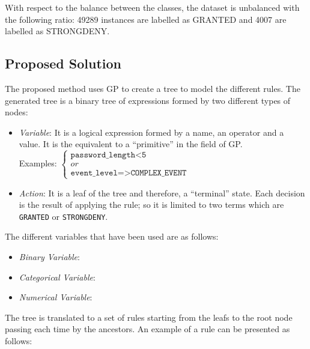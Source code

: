 \documentclass[a4paper,10pt,twocolumn,preprint,3p]{elsarticle}
\begin{document}
With respect to the balance between the classes, the dataset is unbalanced with the following ratio: 49289 instances are labelled as GRANTED and 4007 are labelled as STRONGDENY.

\subsection{Proposed Solution}
\label{subsec:solution}
The proposed method uses GP to create a tree to model the different rules. The generated tree
is a binary tree of expressions formed by two different types of nodes:

\begin{itemize}
\item {\em Variable}: It is a logical expression formed by a name, an operator and a value. It is the equivalent to a ``primitive'' in the field of GP. \\
    Examples:
   \begin{math}
     \left \{
   \begin{array}{l}
     \texttt{password\_length<5} \\
     or \\
      \texttt{event\_level=>COMPLEX\_EVENT}
   \end{array}
   \right .
   \end{math}
\item {\em Action}: It is a leaf of the   tree and therefore, a ``terminal'' state. Each decision is the result of applying the rule; so it is limited to two terms which are \texttt{GRANTED} or \texttt{STRONGDENY}.
\end{itemize}

The different variables that have been used are as follows:

\begin{itemize}
\item {\em Binary Variable}: %
\item {\em Categorical Variable}:
\item {\em Numerical Variable}:

\end{itemize}

The tree is translated to a set of rules starting from the leafs to the root node passing each time by the ancestors. An example of a rule can be presented as follows:
\end{document}
